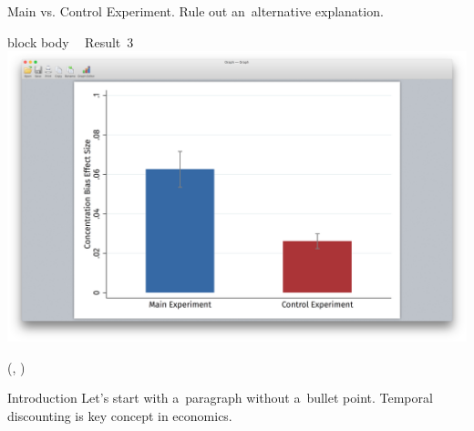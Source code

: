 \documentclass{beamer}
\newlength{\blockThree}
\begin{document}
\begin{frame}[t]
\begin{textblock*}{\colwidth}
\begin{alertblock}{%
	\begin{minipage}[b]{55pt}
		\RaggedRight
		\noindent\hspace{-10pt}
	\end{minipage}%
	\begin{minipage}[b]{\colwidth-125pt}
		Main vs. Control Experiment.\;
		{\mdseries Rule out an~alternative explanation.}
	\end{minipage}%
}
\begin{beamercolorbox}[ht=8.0in, center]{block body}
	\Large\textcolor{SpotColor}{\textbf{~} \hspace{0.5in} {\firasemibold\small Result~3}} \\[15pt]
	\includegraphics[width=9.13in, trim={3.75in 1.75in 3.75in 2in}, clip]
		{1_Example_Content/Images/average_main_control.png} \\[59pt]
\end{beamercolorbox}
\end{alertblock}

\end{textblock*}


\TPshowboxesfalse




\begin{textblock*}{\colwidth}(\leftmargin, \blockThree)

\begin{parblock}{Introduction}
Let's start with a~paragraph without a~bullet point. Temporal discounting is key concept in economics.


\end{parblock}
\end{textblock*}
\end{frame}
\end{document}
